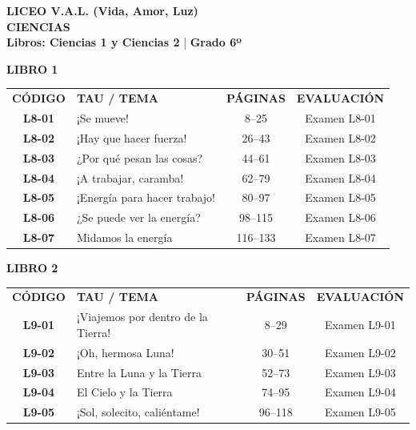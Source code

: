 \documentclass[11pt, letterpaper]{article}
\begin{document}
 
	
	\begin{center} 
		{\Large \textbf{\color{valblue} LICEO V.A.L. (Vida, Amor, Luz)}}\\[0.1cm] 
		{\large \textbf{CIENCIAS}}\\[0.1cm] 
		{\small \quad \textbf{Libros: Ciencias 1 y Ciencias 2} \quad | \quad \textbf{Grado 6º}} 
	\end{center} 
	\vspace{0.2cm} 
	
	
	\noindent \textbf{\large \color{valblue} LIBRO 1} 
	\vspace{0.1cm} 
	\begin{center} 
		\small 
		\begin{tabularx}{\textwidth}{cXcc} 
			\textbf{CÓDIGO} & \textbf{TAU / TEMA} & \textbf{PÁGINAS} & \textbf{EVALUACIÓN} \\ 
			\textbf{L8-01} & ¡Se mueve! &  8--25 & Examen L8-01 \\ 
			\rowcolor{valgray} \textbf{L8-02} & ¡Hay que hacer fuerza! &  26--43 & Examen L8-02 \\ 
			\textbf{L8-03} & ¿Por qué pesan las cosas? &  44--61 & Examen L8-03 \\ 
			\rowcolor{valgray} \textbf{L8-04} & ¡A trabajar, caramba! &  62--79 & Examen L8-04 \\ 
			\textbf{L8-05} & ¡Energía para hacer trabajo! &  80--97 & Examen L8-05 \\ 
			\rowcolor{valgray} \textbf{L8-06} & ¿Se puede ver la energía? &  98--115 & Examen L8-06 \\ 
			\textbf{L8-07} & Midamos la energía &  116--133 & Examen L8-07 \\ 
		\end{tabularx} 
	\end{center} 
	\vspace{0.4cm} 
	
	\noindent \textbf{\large \color{valblue} LIBRO 2} 
	\vspace{0.1cm} 
	\begin{center} 
		\small 
		\begin{tabularx}{\textwidth}{cXcc} 
			\textbf{CÓDIGO} & \textbf{TAU / TEMA} & \textbf{PÁGINAS} & \textbf{EVALUACIÓN} \\ 
			\textbf{L9-01} & ¡Viajemos por dentro de la Tierra! &  8--29 & Examen L9-01 \\ 
			\rowcolor{valgray} \textbf{L9-02} & ¡Oh, hermosa Luna! &  30--51 & Examen L9-02 \\ 
			\textbf{L9-03} & Entre la Luna y la Tierra &  52--73 & Examen L9-03 \\ 
			\rowcolor{valgray} \textbf{L9-04} & El Cielo y la Tierra &  74--95 & Examen L9-04 \\ 
			\textbf{L9-05} & ¡Sol, solecito, caliéntame! &  96--118 & Examen L9-05 \\ 
		\end{tabularx} 
	\end{center} 
	\newpage 
	
\end{document}
